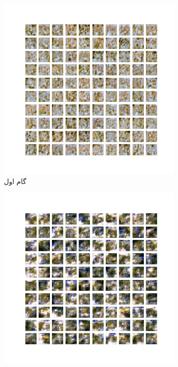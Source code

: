 \documentclass[12pt, a4paper]{book}
\begin{document}
\begin{figure}[h]
    \begin{subfigure}{0.3\linewidth}
        \includegraphics[width=\linewidth]{images/dcgan/noisy_std5.0/generated_img_01.png}
        \caption{گام اول}
    \end{subfigure}
    \begin{subfigure}{0.3\linewidth}
        \includegraphics[width=\linewidth]{images/dcgan/noisy_std5.0/generated_img_15.png}

\end{subfigure}
\end{figure}
\end{document}
